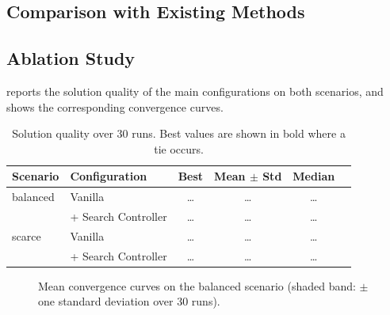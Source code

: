 \subsection{Comparison with Existing Methods}
\label{subsec:comparison}



\subsection{Ablation Study}
\label{subsec:ablation}

 reports the solution quality of the main
configurations on both scenarios, and  shows the
corresponding convergence curves.

% 

\begin{table}[htbp]
  \centering
  \caption{Solution quality over 30 runs. Best values are shown in bold where a
           tie occurs.}
  \label{tab:ablation_results}
  \begin{tabular}{llcccc}
    \toprule
    Scenario & Configuration & Best & Mean $\pm$ Std & Median \\
    \midrule
    balanced & Vanilla \dmde{}      & \dots & \dots & \dots \\
             & + Search Controller  & \dots & \dots & \dots \\
    \midrule
    scarce   & Vanilla \dmde{}      & \dots & \dots & \dots \\
             & + Search Controller  & \dots & \dots & \dots \\
    \bottomrule
  \end{tabular}
\end{table}

\begin{figure}[htbp]
  \centering
  \caption{Mean convergence curves on the balanced scenario (shaded band:
           $\pm$ one standard deviation over 30 runs).}
  \label{fig:convergence}
\end{figure}

